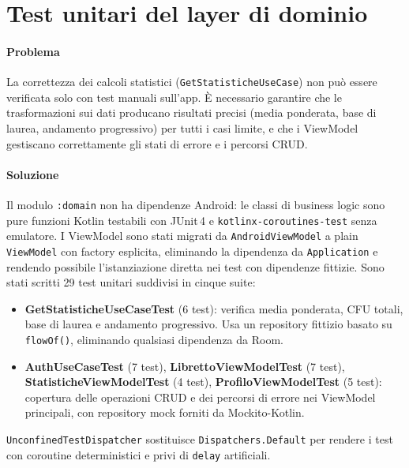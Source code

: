 \documentclass[a4paper,12pt]{report}
\begin{document}
    \section{Test unitari del layer di dominio}

    \paragraph{Problema}
    La correttezza dei calcoli statistici (\texttt{GetStatisticheUseCase}) non può essere
    verificata solo con test manuali sull'app. È necessario garantire che le trasformazioni
    sui dati producano risultati precisi (media ponderata, base di laurea, andamento
    progressivo) per tutti i casi limite, e che i ViewModel gestiscano correttamente
    gli stati di errore e i percorsi CRUD.

    \paragraph{Soluzione}
    Il modulo \texttt{:domain} non ha dipendenze Android: le classi di business logic
    sono pure funzioni Kotlin testabili con JUnit\,4 e \texttt{kotlinx-coroutines-test}
    senza emulatore. I ViewModel sono stati migrati da \texttt{AndroidViewModel}
    a plain \texttt{ViewModel} con factory esplicita, eliminando la dipendenza da
    \texttt{Application} e rendendo possibile l'istanziazione diretta nei test con
    dipendenze fittizie. Sono stati scritti 29 test unitari suddivisi in cinque suite:

    \begin{itemize}
        \item \textbf{GetStatisticheUseCaseTest} (6 test): verifica media ponderata, CFU totali,
        base di laurea e andamento progressivo. Usa un repository fittizio basato su
        \texttt{flowOf()}, eliminando qualsiasi dipendenza da Room.
        \item \textbf{AuthUseCaseTest} (7 test), \textbf{LibrettoViewModelTest} (7 test),
        \textbf{StatisticheViewModelTest} (4 test), \textbf{ProfiloViewModelTest} (5 test):
        copertura delle operazioni CRUD e dei percorsi di errore nei ViewModel principali,
        con repository mock forniti da Mockito-Kotlin.
    \end{itemize}

    \texttt{UnconfinedTestDispatcher} sostituisce \texttt{Dispatchers.Default} per
    rendere i test con coroutine deterministici e privi di \texttt{delay} artificiali.
\end{document}
